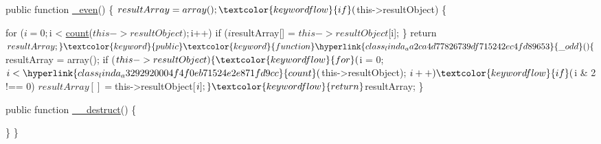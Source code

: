 \begin{DoxyCodeInclude}
    \textcolor{keyword}{public} \textcolor{keyword}{function} \hyperlink{class_linda_aba23584e7eed05b55f294a5f251122a3}{\_even}() \{
        $resultArray = array();
        \textcolor{keywordflow}{if} ($this->resultObject) \{

            \textcolor{keywordflow}{for} ($i = 0; $i < \hyperlink{class_linda_a3292920004f4f0eb71524e2e871fd9cc}{count}($this->resultObject); $i++)
                \textcolor{keywordflow}{if} ($i %
                    $resultArray[] = $this->resultObject[$i];
        \}
        \textcolor{keywordflow}{return} $resultArray;
    \}

    \textcolor{keyword}{public} \textcolor{keyword}{function} \hyperlink{class_linda_aa2ca4d77826739df715242ec4fd89653}{\_odd}() \{

        $resultArray = array();
        \textcolor{keywordflow}{if} ($this->resultObject) \{

            \textcolor{keywordflow}{for} ($i = 0; $i < \hyperlink{class_linda_a3292920004f4f0eb71524e2e871fd9cc}{count}($this->resultObject); $i++)
                \textcolor{keywordflow}{if} ($i & 2 !== 0)
                    $resultArray[] = $this->resultObject[$i];
        \}
        \textcolor{keywordflow}{return} $resultArray;
    \}

    \textcolor{keyword}{public} \textcolor{keyword}{function} \hyperlink{class_linda_a421831a265621325e1fdd19aace0c758}{\_\_destruct}() \{
        
    \}
\}
\end{DoxyCodeInclude}
 